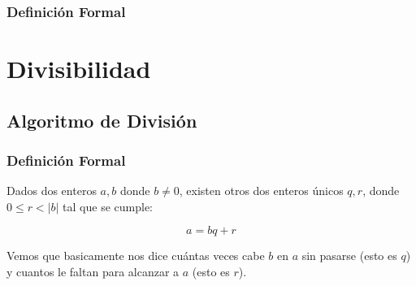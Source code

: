 \documentclass[12pt]{report}                                    %
\begin{document}
        \subsection*{Definición Formal}





\chapter{Divisibilidad}
    \clearpage

     

    \clearpage
    \section{Algoritmo de División}

        \subsection*{Definición Formal}

            Dados dos enteros $a, b$ donde $b \neq 0$, existen otros dos 
            enteros únicos $q, r$, donde $0 \leq r < |b|$ tal que se cumple:

            \begin{equation}
                a = bq+r
            \end{equation}

            Vemos que basicamente nos dice cuántas veces cabe $b$ en $a$ sin pasarse (esto 
            es $q$) y cuantos le faltan para alcanzar a $a$ (esto es $r$).
\end{document}
